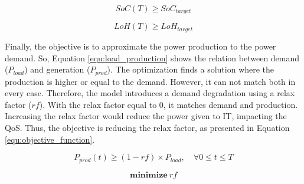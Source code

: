 \begin{equation}
    \label{equ:soc_target}
    SoC(T) \ge SoC_{target}
\end{equation}

\begin{equation}
    \label{equ:loh_target}
    LoH(T) \ge LoH_{target}
\end{equation}

Finally, the objective is to approximate the power production to the power demand. So, Equation \ref{equ:load_production} shows the relation between demand ($P_{load}$) and generation ($P_{prod}$). The optimization finds a solution where the production is higher or equal to the demand. However, it can not match both in every case. Therefore, the model introduces a demand degradation using a relax factor ($rf$). With the relax factor equal to 0, it matches demand and production. Increasing the relax factor would reduce the power given to IT, impacting the QoS. Thus, the objective is reducing the relax factor, as presented in Equation \ref{equ:objective_function}.

\begin{equation}
    \label{equ:load_production}
    P_{prod}(t) \ge (1 - rf) \times P_{load}, \quad \forall 0 \le t \le T
\end{equation}

\begin{equation}
    \label{equ:objective_function}
    \mathbf{minimize}\ rf
\end{equation}




